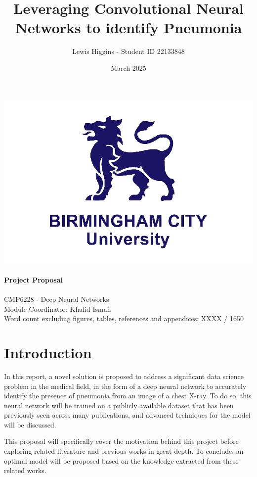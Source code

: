 \documentclass[12pt]{report}
\title{Leveraging Convolutional Neural Networks to identify Pneumonia}
\author{Lewis Higgins - Student ID 22133848}
\date{March 2025}
\newcommand{\para}{\vspace{7pt}\noindent}
\begin{document}
\makeatletter
\begin{titlepage}
    \begin{center}
        \includegraphics[width=0.7\linewidth]{BCU}\\[4ex]
        {\huge \bfseries \@title}\\[2ex]
        {\large \bfseries  Project Proposal}\\[50ex]
        {\@author}\\[2ex]
        {CMP6228 - Deep Neural Networks}\\[2ex]
        {Module Coordinator: Khalid Ismail}\\[2ex]
        {Word count excluding figures, tables, references and appendices: XXXX / 1650}\\[10ex]
    \end{center}
\end{titlepage}
\makeatother
\thispagestyle{empty}
\newpage

\setcounter{page}{0}

\tableofcontents
\thispagestyle{empty}

\chapter*{Introduction}

In this report, a novel solution is proposed to address a significant data science problem in the medical field, in the form of 
a deep neural network to accurately identify the presence of pneumonia from an image of a chest X-ray. To do so, this neural network 
will be trained on a publicly available dataset that has been previously seen across many publications, and advanced techniques 
for the model will be discussed.

\para This proposal will specifically cover the motivation behind this project before exploring related literature and previous works 
in great depth. To conclude, an optimal model will be proposed based on the knowledge extracted from these related works. 
\end{document}

